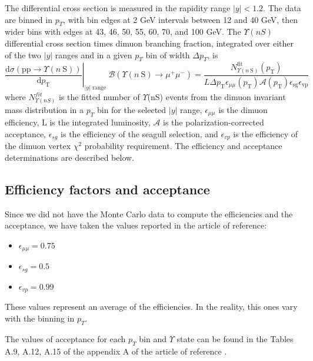 \documentclass[a4paper,11pt]{article}
\begin{document}
The differential cross section is measured in the rapidity range $|y| < 1.2$. The data are binned in $p_T$, with bin edges at 2 GeV intervals between 12 and 40 GeV, then wider bins with edges at 43, 46, 50, 55, 60, 70, and 100 GeV.
The $\Upsilon(nS)$ differential cross section times dimuon branching fraction, integrated over either of the two $|y|$ ranges and in a given $p_T$ bin of width $\Delta p_T$, is
\begin{equation}
\left.\frac{\mathrm{d} \sigma(\mathrm{pp} \rightarrow \Upsilon(n \mathrm{~S}))}{\mathrm{d} p_{\mathrm{T}}}\right|_{|y| \text { range }} \mathcal{B}\left(\Upsilon(n \mathrm{~S}) \rightarrow \mu^{+} \mu^{-}\right)=\frac{N_{\Upsilon(n \mathrm{~S})}^{\mathrm{fit}}\left(p_{\mathrm{T}}\right)}{L \Delta p_{\mathrm{T}} \epsilon_{\mu \mu}\left(p_{\mathrm{T}}\right) \mathcal{A}\left(p_{\mathrm{T}}\right) \epsilon_{\mathrm{sg}} \epsilon_{\mathrm{vp}}}\end{equation} 
where $N^{fit}_{\Upsilon(nS)}$ is the fitted number of $\Upsilon$(nS) events from the dimuon invariant mass distribution in a $p_T$ bin for the selected $|y|$ range, $\epsilon_{\mu\mu}$ is the dimuon efficiency, L is the integrated luminosity, $\mathcal{A}$ is the polarization-corrected acceptance, $\epsilon_{sg}$ is the efficiency of the seagull selection, and $\epsilon_{vp}$ is the efficiency of the dimuon vertex $\chi ^2$ probability requirement. The efficiency and acceptance determinations are described below.

\subsection{Efficiency factors and acceptance}
Since we did not have the Monte Carlo data to compute the efficiencies and the acceptance, we have taken the values reported in the article of reference:
\begin{itemize}
    \item $\epsilon_{\mu\mu} = 0.75$
    \item $\epsilon_{sg}  = 0.5$
    \item $\epsilon_{vp} = 0.99$
\end{itemize}

These values represent an average of the efficiencies. In the reality, this ones vary with the binning in $p_T$.

The values of acceptance for each $p_T$ bin and $\Upsilon$ state can be found in the Tables A.9, A.12, A.15 of the appendix A of the article of reference \cite{Khachatryan_2015}.
\end{document}
